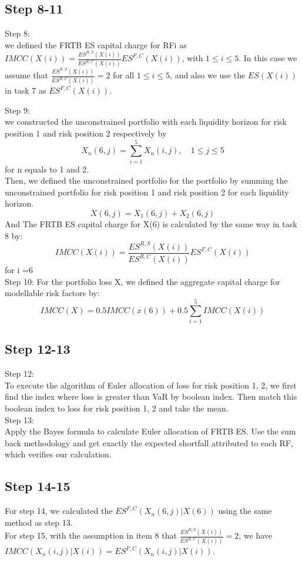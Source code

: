 \documentclass{article}
\begin{document}
\subsection*{Step 8-11}
Step 8:\\
we defined the FRTB ES capital charge for RFi as $IMCC(X(i)) = \frac {ES^{R,S}(X(i))} {ES^{R,C}(X (i))} ES^{F,C}(X(i))$, with $1 \leq i \leq 5$. In this case we assume that $\frac{ES^{R,S}(X(i))} {ES^{R,C}(X(i))} = 2$ for all $1 \leq i \leq 5$, and also we use the $ES(X(i))$ in task 7 as $ES^{F,C}(X(i))$.

\noindent Step 9:\\
we constructed the unconstrained portfolio with each liquidity horizon for risk position 1 and risk position 2 respectively by 
$$
X_n(6,j)=\sum^5_{i=1}X_n(i,j),\quad 1 \leq j \leq 5
$$
\noindent for n equals to 1 and 2.\\ 
\noindent Then, we defined the unconstrained portfolio for the portfolio by summing the unconstrained portfolio for risk position 1 and risk position 2 for each liquidity horizon. 
$$
X(6,j) = X_1(6,j) + X_2(6,j)
$$
\noindent And The FRTB ES capital charge for X(6) is calculated by the same way in task 8 by:
$$
IMCC(X(i)) = \frac{ES^{R,S}(X(i))} {ES^{R,C}(X (i))} ES^{F,C}(X(i))
$$
\noindent for i =6 \\
\noindent Step 10:
\noindent For the portfolio loss X, we defined the aggregate capital charge for modellable risk factors by:
$$
IMCC(X) = 0.5 IMCC(x(6)) + 0.5 \sum^5_{i=1} IMCC(X(i))
$$
\subsection*{Step 12-13}
Step 12:\\
To execute the algorithm of Euler allocation of loss for risk position 1, 2, we first find the index where loss is greater than VaR by boolean index. Then match this boolean index to loss for risk position 1, 2 and take the mean.
\\Step 13:\\
Apply the Bayes formula to calculate Euler allocation of FRTB ES.
Use the sum back methodology and get exactly the expected shortfall attributed to each RF, which verifies our calculation.

\subsection*{Step 14-15}
For step 14, we calculated the $ES^{F,C}(X_n(6,j)|X(6))$ using the same method as step 13.
\\For step 15, with the assumption in item 8 that $\frac {ES^{R,S}(X(i))} {ES^{R,C}(X(i))} = 2$, we have $IMCC(X_n(i,j)|X(i))=ES^{F,C}(X_n(i,j)|X(i))$.
\end{document}
